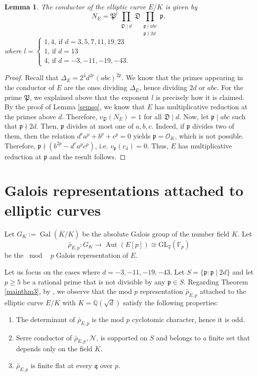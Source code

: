 \documentclass[]{article}
\newtheorem{lemma}{Lemma}
\newcommand {\QQ}{{\mathbb{Q}}}
\newcommand {\mcalO}{{\mathcal{O}}}
\newcommand {\mfp}{{\mathfrak{P}}}
\newcounter{cases}
\begin{document}
\begin{lemma}\label{condE}
    The conductor of the elliptic curve $E/K$ is given by $$N_E=\mfp^l\prod_{\substack{\mathfrak{D} \mid d }} \mathfrak{D} \prod_{\substack{\mathfrak{p} \mid a b c \\ \mathfrak{p} \nmid 2d}} \mathfrak{p},$$where $l=
\left\{\begin{array}{l}
1,4 \text {, if $d=3,5,7,11,19,23$ } \\
1 \text {, if $d=13$ }\\
4 \text {, if $d=-3,-11,-19,-43$. }
\end{array}\right.$
\end{lemma}

\begin{proof}
    Recall that $\Delta_E = 2^4d^{2r}(abc)^{2p}$. We know that the primes appearing in the conductor of $E$ are the ones dividing $\Delta_E$, hence dividing $2d$ or $abc$. For the prime $\mfp$, we explained above that the exponent $l$ is precisely how it is claimed. By the proof of Lemma \ref{semsq}, we know that $E$ has multiplicative reduction at the primes above $d$. Therefore, $v_{\mathfrak{D}}(N_E)=1$ for all $\mathfrak{D}\mid d$. Now, let $\mathfrak{p}\mid abc$ such that $\mathfrak{p}\nmid 2d$. Then, $\mathfrak{p}$ divides at most one of $a,b,c$. Indeed, if $\mathfrak{p} $ divides two of them, then the relation $d^ra^p+b^p+c^p=0$ yields $\mathfrak{p} =\mcalO_K$, which is not possible. Therefore, $\mathfrak{p}\nmid (b^{2p}-d^ra^pc^p)$, i.e. $v_{\mathfrak{p}}(c_4)=0$. Thus, $E$ has multiplicative reduction at $\mathfrak{p}$ and the result follows.
\end{proof}

\section{Galois representations attached to elliptic curves}\label{galoisrepr}

Let $G_K:=\operatorname{Gal}(\overline{K}/K)$ be the absolute Galois group of the number field $K$. Let
$$
\bar{\rho}_{E, p}: G_K \longrightarrow \operatorname{Aut}(E[p]) \cong \mathrm{GL}_2\left(\mathbb{F}_p\right)
$$
be the $\bmod\text{ } p$ Galois representation of $E$.

Let us focus on the cases where $d=-3,-11,-19,-43$. Let $S=\{\mathfrak{p}:\mathfrak{p}\mid 2d\}$ and let $p\ge5$ be a rational prime that is not divisible by any $\mathfrak{p}\in S$. Regarding Theorem \ref{mainthm3}, by \cite[Corollary 3.5]{kara2020asymptotic}, we observe that the mod $p$ representation $\bar{\rho}_{E, p}$ attached to the elliptic curve $E/K$ with $K=\QQ(\sqrt{d})$ satisfy the following properties: 
\begin{enumerate}
    \item The determinant of $\bar{\rho}_{E, p}$ is the mod $p$ cyclotomic character, hence it is odd.
    \item Serre conductor of $\bar{\rho}_{E, p}, \mathcal{N}$, is supported on $S$ and belongs to a finite set that depends only on the field $K$.
    \item $\bar{\rho}_{E, p}$ is finite flat at every $\mathfrak{q}$ over $p$.
\end{enumerate}
\end{document}
